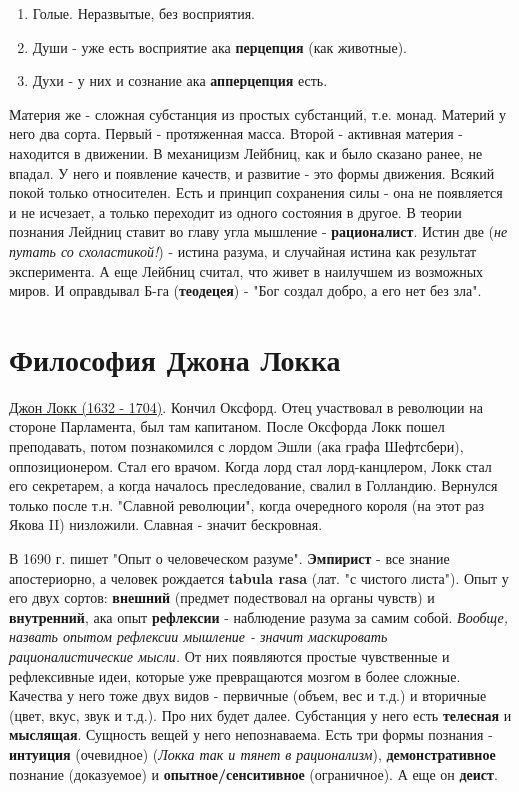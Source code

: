 \begin{enumerate}
\item Голые. Неразвытые, без восприятия.
\item Души - уже есть восприятие ака \textbf{перцепция} (как животные).
\item Духи - у них и сознание ака \textbf{апперцепция} есть.
\end{enumerate}
Материя же - сложная субстанция из простых субстанций, т.е. монад. Материй у него два сорта. Первый - протяженная масса.
Второй - активная материя - находится в движении. В механицизм Лейбниц, как и было сказано ранее, не впадал. У него и появление качеств, и развитие - это формы движения.  Всякий покой только относителен. Есть и принцип сохранения силы - она не появляется и не исчезает, а только переходит из одного состояния в другое. В теории познания Лейдниц ставит во главу угла мышление - \textbf{рационалист}. Истин две (\textit{не путать со схоластикой!}) - истина разума, и случайная истина как результат эксперимента. А еще Лейбниц считал, что живет в наилучшем из возможных миров. И оправдывал Б-га (\textbf{теодецея}) - "Бог создал добро, а его нет без зла".


\section{Философия Джона Локка}
\underline{Джон Локк (1632 - 1704)}. Кончил Оксфорд. Отец участвовал в революции на стороне Парламента, был там капитаном. После Оксфорда Локк пошел преподавать, потом познакомился с лордом Эшли (ака графа Шефтсбери), оппозиционером. Стал его врачом. Когда лорд стал лорд-канцлером, Локк стал его секретарем, а когда началось преследование, свалил в Голландию. Вернулся только после т.н. "Славной революции", когда очередного короля (на этот раз Якова II) низложили. Славная - значит бескровная. 

В 1690 г. пишет "Опыт о человеческом разуме". \textbf{Эмпирист} - все  знание апостериорно, а человек рождается \textbf{tabula rasa} (лат. "с чистого листа"). Опыт у его двух сортов: \textbf{внешний} (предмет подествовал на органы чувств) и \textbf{внутренний}, ака опыт \textbf{рефлексии} - наблюдение разума за самим собой. \textit{Вообще, назвать опытом рефлексии мышление - значит маскировать рационалистические мысли.} От них появляются простые чувственные и рефлексивные идеи, которые уже превращаются мозгом в более сложные. Качества у него тоже двух видов - первичные (объем, вес и т.д.) и вторичные (цвет, вкус, звук и т.д.). Про них будет далее. Субстанция у него есть \textbf{телесная} и \textbf{мыслящая}. Сущность вещей у него непознаваема. Есть три формы познания - \textbf{интуиция} (очевидное) (\textit{Локка так и тянет в рационализм}), \textbf{демонстративное} познание (доказуемое) и \textbf{опытное/сенситивное} (ограничное). А еще он \textbf{деист}.

